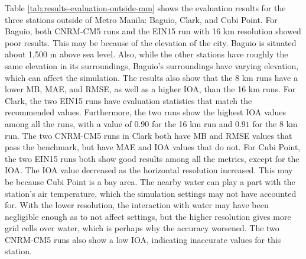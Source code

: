 		Table \ref{tab:results-evaluation-outside-mm} shows the evaluation results for the three stations outside of Metro Manila: Baguio, Clark, and Cubi Point.
		For Baguio, both CNRM-CM5 runs and the EIN15 run with 16 km resolution showed poor results.
		This may be because of the elevation of the city.
		Baguio is situated about 1,500 m above sea level.
		Also, while the other stations have roughly the same elevation in its surroundings, Baguio’s surroundings have varying elevation, which can affect the simulation.
		The results also show that the 8 km runs have a lower MB, MAE, and RMSE, as well as a higher IOA, than the 16 km runs.
		For Clark, the two EIN15 runs have evaluation statistics that match the recommended values.
		Furthermore, the two runs show the highest IOA values among all the runs, with a value of $0.90$ for the 16 km run and $0.91$ for the 8 km run.
		The two CNRM-CM5 runs in Clark both have MB and RMSE values that pass the benchmark, but have MAE and IOA values that do not.
		For Cubi Point, the two EIN15 runs both show good results among all the metrics, except for the IOA.
		The IOA value decreased as the horizontal resolution increased. This may be because Cubi Point is a bay area. 
		The nearby water can play a part with the station’s air temperature, which the simulation settings may not have accounted for.
		With the lower resolution, the interaction with water may have been negligible enough as to not affect settings, but the higher resolution gives more grid cells over water, which is perhaps why the accuracy worsened.
		The two CNRM-CM5 runs also show a low IOA, indicating inaccurate values for this station.
	
